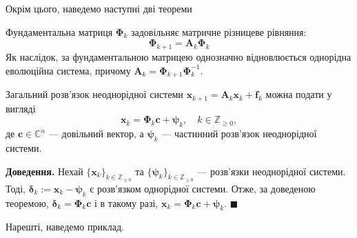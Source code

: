 \documentclass{hw_template}
\begin{document}
Окрім цього, наведемо наступні дві теореми

\begin{theorem}
    Фундаментальна матриця $\boldsymbol{\Phi}_k$ задовільняє матричне різницеве рівняння:
    \begin{equation*}
        \boldsymbol{\Phi}_{k+1} = \boldsymbol{A}_k\boldsymbol{\Phi}_k
    \end{equation*}
    Як наслідок, за фундаментальною матрицею однозначно відновлюється однорідна еволюційна 
    система, причому $\boldsymbol{A}_k = \boldsymbol{\Phi}_{k+1}\boldsymbol{\Phi}_k^{-1}$.
\end{theorem}

\begin{theorem}
    Загальний розв'язок неоднорідної системи $\mathbf{x}_{k+1} = \boldsymbol{A}_k\mathbf{x}_k + \boldsymbol{f}_k$ можна подати у вигляді
    \begin{equation*}
        \mathbf{x}_k = \boldsymbol{\Phi}_k\boldsymbol{c} + \boldsymbol{\psi}_k, \quad k \in \mathbb{Z}_{\geq 0},
    \end{equation*}
    де $\boldsymbol{c} \in \mathbb{C}^n$ --- довільний вектор, а $\boldsymbol{\psi}_k$ --- частинний розв'язок неоднорідної системи.
\end{theorem}

\textbf{Доведення.} Нехай $\{\mathbf{x}_k\}_{k \in \mathbb{Z}_{\geq 0}}$ та $\{\boldsymbol{\psi}_k\}_{k \in \mathbb{Z}_{\geq 0}}$ --- розв'язки 
неоднорідної системи. Тоді, $\boldsymbol{\delta}_k := \mathbf{x}_k - \boldsymbol{\psi}_k$ є розв'язком однорідної системи. Отже,
за доведеною теоремою, $\boldsymbol{\delta}_k = \boldsymbol{\Phi}_k\boldsymbol{c}$ і в такому разі, $\mathbf{x}_k = \boldsymbol{\Phi}_k\boldsymbol{c} + \boldsymbol{\psi}_k$. $\blacksquare$

Нарешті, наведемо приклад.
\end{document}

